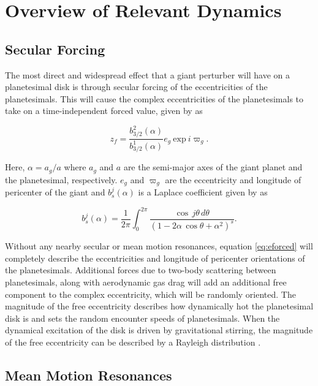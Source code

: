 \documentclass[twocolumn]{aastex63}
\begin{document}
\section{Overview of Relevant Dynamics} \label{sec:dynamics}

\subsection{Secular Forcing}\label{sec:sec_force}

The most direct and widespread effect that a giant perturber will have on a planetesimal disk is through secular forcing of the 
eccentricities of the planetesimals. This will cause the complex eccentricities of the planetesimals to take on a time-independent 
forced value, given by \citep{1999ApJ...527..918W} as

\begin{equation}\label{eq:eforced}
	z_{f} = \frac{b^{2}_{3/2} (\alpha)}{b^{1}_{3/2} (\alpha)} e_{g} ~ \mathrm{exp} ~ i \varpi_{g}.
\end{equation}

\noindent Here, $\alpha = a_{g} / a$ where $a_{g}$ and $a$ are the semi-major axes of the giant planet and the planetesimal, 
respectively. $e_{g}$ and $\varpi_{g}$ are the eccentricity and longitude of pericenter of the giant and $b^{j}_{s} (\alpha)$ is a 
Laplace coefficient given by \citep{2000ssd..book.....M} as

\begin{equation}\label{eq:lap}
	b_{s}^{j}(\alpha) = \frac{1}{2 \pi} \int_{0}^{2 \pi} \frac{\cos \, j \theta \, d \theta}{\left( 1 - 2 \alpha \, \cos \theta + \alpha^2 \right)^{s}}.
\end{equation}

Without any nearby secular or mean motion resonances, equation \ref{eq:eforced} will completely describe the eccentricities and longitude of  
pericenter orientations of the planetesimals. Additional forces due to two-body scattering between planetesimals, along with 
aerodynamic gas drag will add an additional free component to the complex eccentricity, which will be randomly oriented. The 
magnitude of the free eccentricity describes how dynamically hot the planetesimal disk is and sets the random encounter speeds of 
planetesimals. When the dynamical excitation of the disk is driven by gravitational stirring, the magnitude of the free eccentricity can 
be described by a Rayleigh distribution \citep{1992Icar...96..107I}.

\subsection{Mean Motion Resonances}
\end{document}

